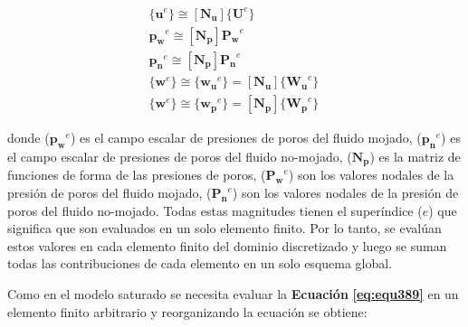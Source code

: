\begin{ceqn} 
\begin{subequations} \label{eq:equ390} 
\begin{gather}
\{\mathbf{u}^e\} \cong  \left[\mathbf{N_u}\right] \{\mathbf{U}^e\} \label{eq:equ390a}\\[10pt]
\mathbf{p_w}^e \cong  \left[\mathbf{N_p}\right] \mathbf{P_w}^e \label{eq:equ390b}\\[10pt]
\mathbf{p_n}^e \cong  \left[\mathbf{N_p}\right] \mathbf{P_n}^e \label{eq:equ390c}\\[10pt]
\{\mathbf{w}^e\} \cong \{\mathbf{w_u}^e\} = \left[\mathbf{N_u}\right] \{\mathbf{W_u}^e\}\ \label{eq:equ390d}\\[10pt]
\{\mathbf{w}^e\} \cong \{\mathbf{w_p}^e\} = \left[\mathbf{N_p}\right] \{\mathbf{W_p}^e\}\ \label{eq:equ390e}
\end{gather}  
\end{subequations} 
\end{ceqn}

donde ($\mathbf{p_w}^e$) es el campo escalar de presiones de poros del fluido mojado, ($\mathbf{p_n}^e$) es el campo escalar de presiones de poros del fluido no-mojado, ($\mathbf{N_p}$) es la matriz de funciones de forma de las presiones de poros, ($\mathbf{P_w}^e$) son los valores nodales de la presión de poros del fluido mojado, ($\mathbf{P_n}^e$) son los valores nodales de la presión de poros del fluido no-mojado. Todas estas magnitudes tienen el superíndice ($e$) que significa que son evaluados en un solo elemento finito. Por lo tanto, se evalúan estos valores en cada elemento finito del dominio discretizado y luego se suman todas las contribuciones de cada elemento en un solo esquema global.\bigskip

Como en el modelo saturado se necesita evaluar la \textbf{Ecuación} \textbf{\ref{eq:equ389}} en un elemento finito arbitrario y reorganizando la ecuación se obtiene:

